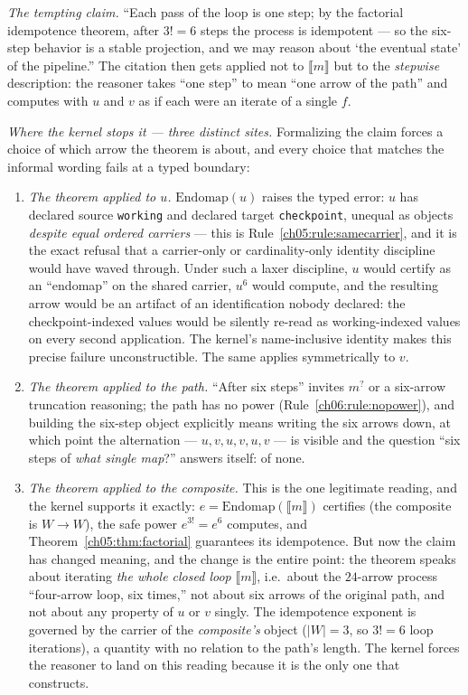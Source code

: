 \emph{The tempting claim.} ``Each pass of the loop is one step; by the
factorial idempotence theorem, after $3! = 6$ steps the process is
idempotent --- so the six-step behavior is a stable projection, and we may
reason about `the eventual state' of the pipeline.'' The citation then
gets applied not to $\llbracket m \rrbracket$ but to the \emph{stepwise}
description: the reasoner takes ``one step'' to mean ``one arrow of the
path'' and computes with $u$ and $v$ as if each were an iterate of a
single $f$.

\emph{Where the kernel stops it --- three distinct sites.} Formalizing the
claim forces a choice of which arrow the theorem is about, and every
choice that matches the informal wording fails at a typed boundary:

\begin{enumerate}
\item \emph{The theorem applied to $u$.} $\mathrm{Endomap}(u)$ raises the
typed error: $u$ has declared source \texttt{working} and declared target
\texttt{checkpoint}, unequal as objects \emph{despite equal ordered
carriers} --- this is Rule~\ref{ch05:rule:samecarrier}, and it is the
exact refusal that a carrier-only or cardinality-only identity discipline
would have waved through. Under such a laxer discipline, $u$ would certify
as an ``endomap'' on the shared carrier, $u^{6}$ would compute, and the
resulting arrow would be an artifact of an identification nobody declared:
the checkpoint-indexed values would be silently re-read as working-indexed
values on every second application. The kernel's name-inclusive identity
makes this precise failure unconstructible. The same applies
symmetrically to $v$.
\item \emph{The theorem applied to the path.} ``After six steps'' invites
$m^{?}$ or a six-arrow truncation reasoning; the path has no power
(Rule~\ref{ch06:rule:nopower}), and building the six-step object
explicitly means writing the six arrows down, at which point the
alternation --- $u, v, u, v, u, v$ --- is visible and the question ``six
steps of \emph{what single map}?'' answers itself: of none.
\item \emph{The theorem applied to the composite.} This is the one
legitimate reading, and the kernel supports it exactly:
$e = \mathrm{Endomap}(\llbracket m \rrbracket)$ certifies (the composite
is $W \to W$), the safe power $e^{3!} = e^{6}$ computes, and
Theorem~\ref{ch05:thm:factorial} guarantees its idempotence. But now the
claim has changed meaning, and the change is the entire point: the theorem
speaks about iterating \emph{the whole closed loop} $\llbracket m
\rrbracket$, i.e.\ about the $24$-arrow process ``four-arrow loop, six
times,'' not about six arrows of the original path, and not about any
property of $u$ or $v$ singly. The idempotence exponent is governed by the
carrier of the \emph{composite's} object ($|W| = 3$, so $3! = 6$ loop
iterations), a quantity with no relation to the path's length. The kernel
forces the reasoner to land on this reading because it is the only one
that constructs.
\end{enumerate}

